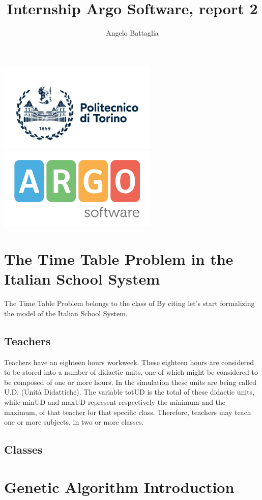 \documentclass{article}
\author{Angelo Battaglia}
\title{Internship Argo Software, report 2}
\begin{document}
\maketitle

\begin{center}
\includegraphics[width=3in]{./images/polito.jpg}
\includegraphics[width=3in]{./images/og_logoargosoft.png}
\end{center}

\section{The Time Table Problem in the Italian School System}

The Time Table Problem belongs to the class of
By citing \textcite{colorni1992genetic} let's start formalizing 
the model of the Italian School System.

\subsection{Teachers}

Teachers have an eighteen hours workweek. These eighteen hours are
considered to be stored into a number of didactic units, one of which
might be considered to be composed of one or more hours. In the simulation
these units are being called U.D. (Unità Didattiche). The variable totUD is
the total of these didactic units, while minUD and maxUD represent respectively
the minimum and the maximum, of that teacher for that specific class. Therefore, 
teachers may teach one or more subjects, in two or more classes. 

\subsection{Classes}

\section{Genetic Algorithm Introduction}

\printbibliography[title = {Bibliography}]
\end{document}
